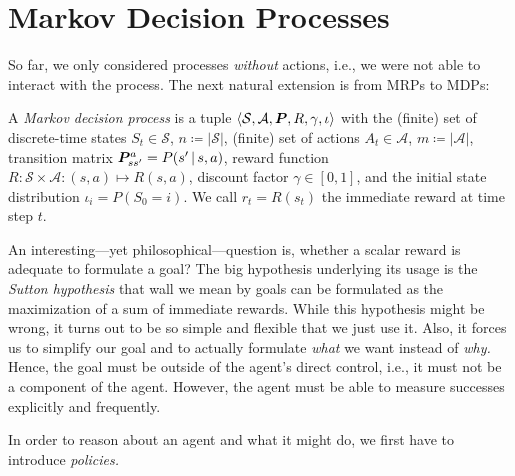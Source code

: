 	\section{Markov Decision Processes}
		So far, we only considered processes \emph{without} actions, i.e., we were not able to interact with the process. The next natural extension is from \acp{MRP} to \acp{MDP}:
		\begin{definition}
			A \emph{Markov decision process} is a tuple \( \langle \mathcal{S}, \mathcal{A}, \bm{P}, R, \gamma, \iota \rangle \) with the (finite) set of discrete-time states \(S_t \in \mathcal{S}\), \(n \coloneqq \lvert \mathcal{S} \rvert\), (finite) set of actions \(A_t \in \mathcal{A}\), \( m \coloneqq \lvert \mathcal{A} \rvert \), transition matrix \( \bm{P}_{ss'}^{a} = P(s' \,\vert\, s, a) \), reward function \( R : \mathcal{S} \times \mathcal{A} : (s, a) \mapsto R(s, a) \), discount factor \( \gamma \in [0, 1] \), and the initial state distribution \( \iota_i = P(S_0 = i) \). We call \( r_t = R(s_t) \) the immediate reward at time step \(t\).
		\end{definition}
		An interesting---yet philosophical---question is, whether a scalar reward is adequate to formulate a goal? The big hypothesis underlying its usage is the \emph{Sutton hypothesis} that wall we mean by goals can be formulated as the maximization of a sum of immediate rewards. While this hypothesis might be wrong, it turns out to be so simple and flexible that we just use it. Also, it forces us to simplify our goal and to actually formulate \emph{what} we want instead of \emph{why.} Hence, the goal must be outside of the agent's direct control, i.e., it must not be a component of the agent. However, the agent must be able to measure successes explicitly and frequently.

		In order to reason about an agent and what it might do, we first have to introduce \emph{policies.}

